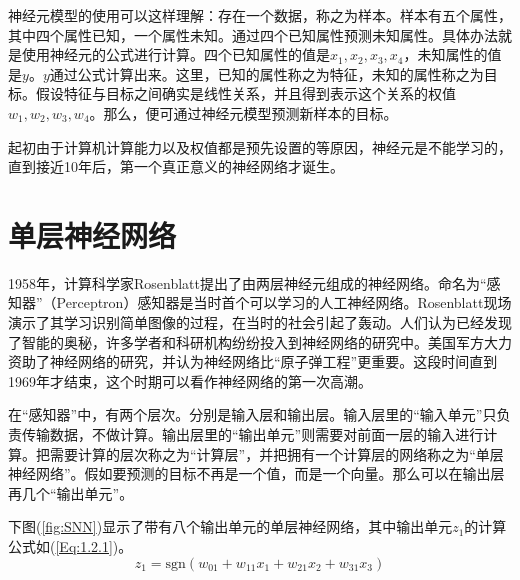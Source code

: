 \documentclass[UTF-8]{progbookcn}
\begin{document}
神经元模型的使用可以这样理解：存在一个数据，称之为样本。样本有五个属性，其中四个属性已知，一个属性未知。通过四个已知属性预测未知属性。具体办法就是使用神经元的公式进行计算。四个已知属性的值是$x_1,x_2,x_3,x_4$，未知属性的值是$y$。$y$通过公式计算出来。这里，已知的属性称之为特征，未知的属性称之为目标。假设特征与目标之间确实是线性关系，并且得到表示这个关系的权值$w_1,w_2,w_3,w_4$。那么，便可通过神经元模型预测新样本的目标。

起初由于计算机计算能力以及权值都是预先设置的等原因，神经元是不能学习的，直到接近10年后，第一个真正意义的神经网络才诞生。

\section{单层神经网络}
1958年，计算科学家Rosenblatt提出了由两层神经元组成的神经网络。命名为“感知器”（Perceptron）感知器是当时首个可以学习的人工神经网络\cite{Rosenblatt58theperceptron:}。Rosenblatt现场演示了其学习识别简单图像的过程，在当时的社会引起了轰动。人们认为已经发现了智能的奥秘，许多学者和科研机构纷纷投入到神经网络的研究中。美国军方大力资助了神经网络的研究，并认为神经网络比“原子弹工程”更重要。这段时间直到1969年才结束，这个时期可以看作神经网络的第一次高潮。

在“感知器”中，有两个层次。分别是输入层和输出层。输入层里的“输入单元”只负责传输数据，不做计算。输出层里的“输出单元”则需要对前面一层的输入进行计算。把需要计算的层次称之为“计算层”，并把拥有一个计算层的网络称之为“单层神经网络”。假如要预测的目标不再是一个值，而是一个向量。那么可以在输出层再几个“输出单元”。

下图(\ref{fig:SNN})显示了带有八个输出单元的单层神经网络，其中输出单元$z_1$的计算公式如(\ref{Eq:1.2.1})。
\begin{equation}\label{Eq:1.2.1}
  z_1 = \text{sgn}(w_{01}+w_{11}x_1+w_{21}x_2+w_{31}x_3)
\end{equation}

%
%
%
%
%
\end{document}
